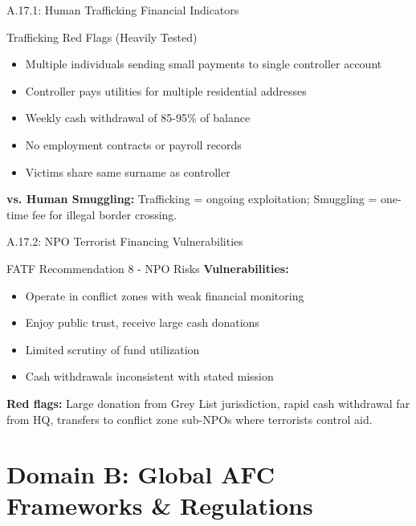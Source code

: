 \documentclass{beamer}
\begin{document}
	\begin{frame}{A.17.1: Human Trafficking Financial Indicators}
		\begin{block}{Trafficking Red Flags (Heavily Tested)}
			\begin{itemize}
				\item Multiple individuals sending small payments to single controller account
				\item Controller pays utilities for multiple residential addresses
				\item Weekly cash withdrawal of 85-95\% of balance
				\item No employment contracts or payroll records
				\item Victims share same surname as controller
			\end{itemize}
		\end{block}
		\textbf{vs. Human Smuggling:} Trafficking = ongoing exploitation; Smuggling = one-time fee for illegal border crossing.
	\end{frame}
	
	\begin{frame}{A.17.2: NPO Terrorist Financing Vulnerabilities}
		\begin{block}{FATF Recommendation 8 - NPO Risks}
			\textbf{Vulnerabilities:}
			\begin{itemize}
				\item Operate in conflict zones with weak financial monitoring
				\item Enjoy public trust, receive large cash donations
				\item Limited scrutiny of fund utilization
				\item Cash withdrawals inconsistent with stated mission
			\end{itemize}
		\end{block}
		\textbf{Red flags:} Large donation from Grey List jurisdiction, rapid cash withdrawal far from HQ, transfers to conflict zone sub-NPOs where terrorists control aid.
	\end{frame}
	
	
	\section{Domain B: Global AFC Frameworks \& Regulations}
	
\end{document}
